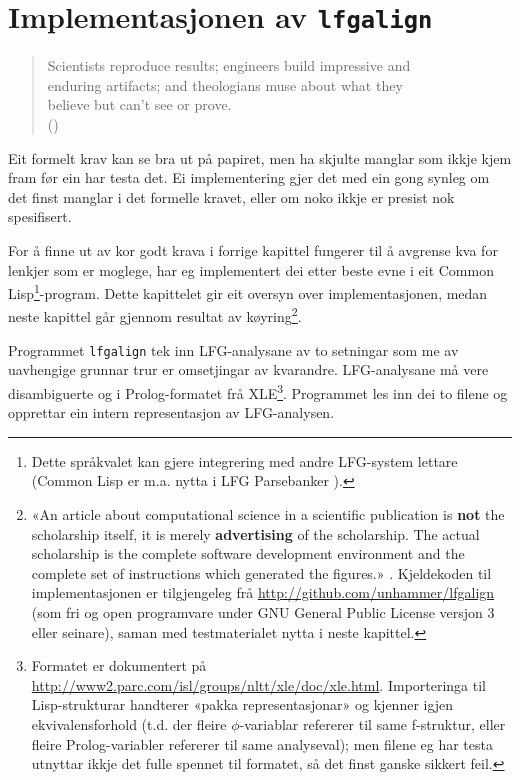 \documentclass[12pt,a4paper,oneside,draft]{report}
\newcommand{\q}[2]{\begin{quotation}\raggedleft{}#1\\\vspace{0.2cm}(#2)\vspace{1.2cm}\end{quotation}}
\begin{document}
\chapter{Implementasjonen av \texttt{lfgalign}}
\label{sec-4}

\label{SEC:implementasjon}

   \q{Scientists reproduce results; engineers build impressive and \\enduring
   artifacts; and theologians muse about what they \\believe but can't see
   or prove.}
   {\citealp[s.~466]{pedersen2008enm}}

Eit formelt krav kan se bra ut på papiret, men ha skjulte manglar som
ikkje kjem fram før ein har testa det.  Ei implementering gjer det med
ein gong synleg om det finst manglar i det formelle kravet, eller om
noko ikkje er presist nok spesifisert.

For å finne ut av kor godt krava i forrige kapittel fungerer til å
avgrense kva for lenkjer som er moglege, har eg implementert dei etter
beste evne i eit Common Lisp\footnote{Dette språkvalet kan gjere integrering med andre LFG-system
        lettare (Common Lisp er m.a. nytta i LFG Parsebanker
        \citep{rosen2009lpt}). }-program. Dette kapittelet gir eit
oversyn over implementasjonen, medan neste kapittel går gjennom
resultat av køyring\footnote{«An article about computational science in a scientific
       publication is \textbf{not} the scholarship itself, it is
       merely \textbf{advertising} of the scholarship. The actual
       scholarship is the complete software development environment
       and the complete set of instructions which generated the
       figures.» \citep[Jon Claerbout, i][s.~7--8]{stodden2009err}.
       Kjeldekoden til implementasjonen er tilgjengeleg frå
       \href{http://github.com/unhammer/lfgalign}{http://github.com/unhammer/lfgalign} (som fri og open
       programvare under GNU General Public License versjon 3 eller
       seinare), saman med testmaterialet nytta i neste kapittel. }.

Programmet \texttt{lfgalign} tek inn LFG-analysane av to
setningar som me av uavhengige grunnar trur er omsetjingar av
kvarandre. LFG-analysane må vere disambiguerte og i Prolog-formatet
frå XLE\footnote{Formatet er dokumentert på
       \href{http://www2.parc.com/isl/groups/nltt/xle/doc/xle.html}{http://www2.parc.com/isl/groups/nltt/xle/doc/xle.html}. Importeringa
       til Lisp-strukturar handterer «pakka representasjonar» og
       kjenner igjen ekvivalensforhold (t.d. der fleire
       $\phi$-variablar refererer til same f\hyp{}struktur, eller fleire
       Prolog-variabler refererer til same analyseval); men filene eg
       har testa utnyttar ikkje det fulle spennet til formatet, så det
       finst ganske sikkert feil. }. Programmet les inn dei to filene og opprettar ein
intern representasjon av LFG-analysen.  
\end{document}
